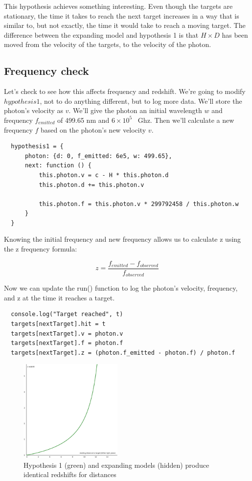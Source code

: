 \documentclass{ws-mpla}
\begin{document}
This hypothesis achieves something interesting. Even though the targets are stationary, the time it takes to reach the next target increases in a way that is similar to, but not exactly, the time it would take to reach a moving target.
The difference between the expanding model and hypothesis 1 is that $H \times D$ has been moved from the velocity of the targets, to the velocity of the photon.

\subsection{Frequency check}

Let's check to see how this affects frequency and redshift. We're going to modify $hypothesis1$, not to do anything different, but to log more data. 
We'll store the photon's velocity as $v$. We'll give the photon an initial wavelength $w$ and frequency $f_{emitted}$ of 499.65 nm and $6\times 10^5$  Ghz. 
Then we'll calculate a new frequency $f$ based on the photon's new velocity $v$.

\begin{verbatim}
  hypothesis1 = {
      photon: {d: 0, f_emitted: 6e5, w: 499.65},
      next: function () {
          this.photon.v = c - H * this.photon.d
          this.photon.d += this.photon.v
  
          this.photon.f = this.photon.v * 299792458 / this.photon.w
      }
  }
\end{verbatim}

Knowing the initial frequency and new frequency allows us to calculate z using the z frequency formula:

\begin{equation}
z = \frac{f_{emitted} - f_{observed}}{f_{observed}}
\end{equation}

Now we can update the run() function to log the photon's velocity, frequency, and z at the time it reaches a target.

\begin{verbatim}
  console.log("Target reached", t)
  targets[nextTarget].hit = t
  targets[nextTarget].v = photon.v
  targets[nextTarget].f = photon.f
  targets[nextTarget].z = (photon.f_emitted - photon.f) / photon.f
\end{verbatim}

\begin{figure}[p]
\centerline{\includegraphics[width=2.0in]{graph_white_z.eps}}
\vspace*{8pt}
\caption{Hypothesis 1 (green) and expanding models (hidden) produce identical redshifts for distances}
\label{fig:distancez}
\end{figure}
\end{document}
